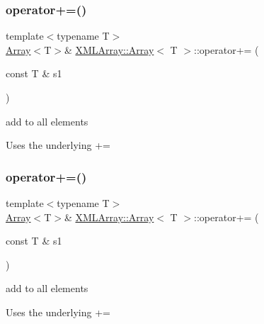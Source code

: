 \subsubsection{\texorpdfstring{operator+=()}{operator+=()}\hspace{0.1cm}{\footnotesize\ttfamily [3/4]}}
{\footnotesize\ttfamily template$<$typename T$>$ \\
\mbox{\hyperlink{classXMLArray_1_1Array}{Array}}$<$T$>$\& \mbox{\hyperlink{classXMLArray_1_1Array}{X\+M\+L\+Array\+::\+Array}}$<$ T $>$\+::operator+= (\begin{DoxyParamCaption}\item[{const T \&}]{s1 }\end{DoxyParamCaption})\hspace{0.3cm}{\ttfamily [inline]}}



add to all elements 

Uses the underlying += \mbox{\label{classXMLArray_1_1Array_ad3487cb84f2a45cc24ed06f5e96a62ee}} 
\subsubsection{\texorpdfstring{operator+=()}{operator+=()}\hspace{0.1cm}{\footnotesize\ttfamily [4/4]}}
{\footnotesize\ttfamily template$<$typename T$>$ \\
\mbox{\hyperlink{classXMLArray_1_1Array}{Array}}$<$T$>$\& \mbox{\hyperlink{classXMLArray_1_1Array}{X\+M\+L\+Array\+::\+Array}}$<$ T $>$\+::operator+= (\begin{DoxyParamCaption}\item[{const T \&}]{s1 }\end{DoxyParamCaption})\hspace{0.3cm}{\ttfamily [inline]}}



add to all elements 

Uses the underlying += \mbox{\label{classXMLArray_1_1Array_aa92c6d59ed6a656c3004db85bd67c192}} 
